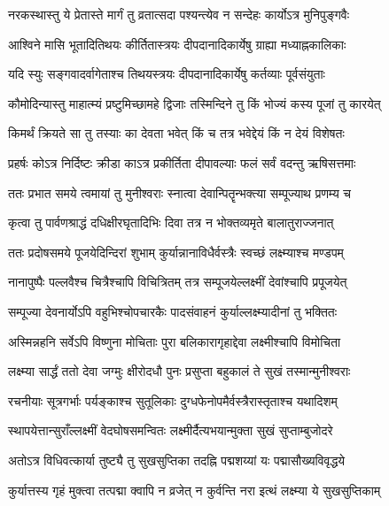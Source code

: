 \twolineshloka
{नरकस्थास्तु ये प्रेतास्ते मार्गं तु व्रतात्सदा}
{पश्यन्त्येव न सन्देहः कार्योऽत्र मुनिपुङ्गवैः} %

\twolineshloka
{आश्विने मासि भूतादितिथयः कीर्तितास्त्रयः}
{दीपदानादिकार्येषु ग्राह्या मध्याह्नकालिकाः} %

\twolineshloka
{यदि स्युः सङ्गवादर्वागेताश्च तिथयस्त्रयः}
{दीपदानादिकार्येषु कर्तव्याः पूर्वसंयुताः} %


\twolineshloka
{कौमोदिन्यास्तु माहात्म्यं प्रष्टुमिच्छामहे द्विजाः}
{तस्मिन्दिने तु किं भोज्यं कस्य पूजां तु कारयेत्} %

\twolineshloka
{किमर्थं क्रियते सा तु तस्याः का देवता भवेत्}
{किं च तत्र भवेद्देयं किं न देयं विशेषतः} %

\twolineshloka
{प्रहर्षः कोऽत्र निर्दिष्टः क्रीडा काऽत्र प्रकीर्तिता}
{दीपावल्याः फलं सर्वं वदन्तु ऋषिसत्तमाः} %


\twolineshloka
{ततः प्रभात समये त्वमायां तु मुनीश्वराः}
{स्नात्वा देवान्पितॄन्भक्त्या सम्पूज्याथ प्रणम्य च} %

\twolineshloka
{कृत्वा तु पार्वणश्राद्धं दधिक्षीरघृतादिभिः}
{दिवा तत्र न भोक्तव्यमृते बालातुराज्जनात्} %

\twolineshloka
{ततः प्रदोषसमये पूजयेदिन्दिरां शुभाम्}
{कुर्यान्नानाविधैर्वस्त्रैः स्वच्छं लक्ष्म्याश्च मण्डपम्} %

\twolineshloka
{नानापुष्पैः पल्लवैश्च चित्रैश्चापि विचित्रितम्}
{तत्र सम्पूजयेल्लक्ष्मीं देवांश्चापि प्रपूजयेत्} %

\twolineshloka
{सम्पूज्या देवनार्योऽपि वहुभिश्चोपचारकैः}
{पादसंवाहनं कुर्याल्लक्ष्म्यादीनां तु भक्तितः} %

\twolineshloka
{अस्मिन्नहनि सर्वेऽपि विष्णुना मोचिताः पुरा}
{बलिकारागृहाद्देवा लक्ष्मीश्चापि विमोचिता} %

\twolineshloka
{लक्ष्म्या सार्द्धं ततो देवा जग्मुः क्षीरोदधौ पुनः}
{प्रसुप्ता बहुकालं ते सुखं तस्मान्मुनीश्वराः} %

\twolineshloka
{रचनीयाः सूत्रगर्भाः पर्यङ्काश्च सुतूलिकाः}
{दुग्धफेनोपमैर्वस्त्रैरास्तृताश्च यथादिशम्} %

\twolineshloka
{स्थापयेत्तान्सुराँल्लक्ष्मीं वेदघोषसमन्वितः}
{लक्ष्मीर्दैत्यभयान्मुक्ता सुखं सुप्ताम्बुजोदरे} %

\twolineshloka
{अतोऽत्र विधिवत्कार्या तुष्ट्यै तु सुखसुप्तिका}
{तदह्नि पद्मशय्यां यः पद्मासौख्यविवृद्धये} %

\twolineshloka
{कुर्यात्तस्य गृहं मुक्त्वा तत्पद्मा क्वापि न व्रजेत्}
{न कुर्वन्ति नरा इत्थं लक्ष्म्या ये सुखसुप्तिकाम्} %

